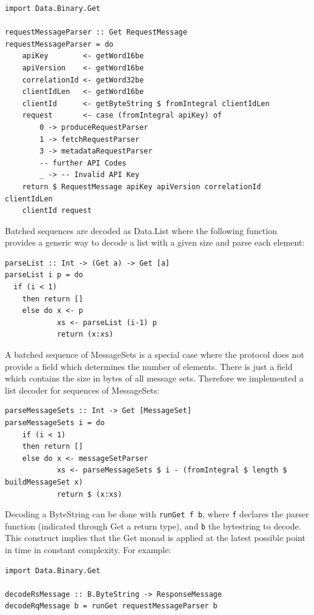 \begin{lstlisting}[caption={Decode of RequestMessage, based on ApiKey}]
import Data.Binary.Get

requestMessageParser :: Get RequestMessage 
requestMessageParser = do 
    apiKey        <- getWord16be
    apiVersion    <- getWord16be
    correlationId <- getWord32be
    clientIdLen   <- getWord16be
    clientId      <- getByteString $ fromIntegral clientIdLen
    request       <- case (fromIntegral apiKey) of
        0 -> produceRequestParser
        1 -> fetchRequestParser
        3 -> metadataRequestParser
        -- further API Codes 
        _ -> -- Invalid API Key 
    return $ RequestMessage apiKey apiVersion correlationId clientIdLen
    clientId request
\end{lstlisting}

Batched sequences are decoded as Data.List where the following function
provides a generic way to decode a list with a given size and parse each
element:
\begin{lstlisting}[caption={Decode list of any type}]
parseList :: Int -> (Get a) -> Get [a]
parseList i p = do 
  if (i < 1) 
    then return []
    else do x <- p
            xs <- parseList (i-1) p
            return (x:xs)
\end{lstlisting}

A batched sequence of MessageSets is a special case where the protocol does not
provide a field which determines the number of elements. There is just a field
which contains the size in bytes of all message sets. Therefore we implemented a
list decoder for sequences of MessageSets:

\begin{lstlisting}[caption={Decode list of MessageSet's}]
parseMessageSets :: Int -> Get [MessageSet]
parseMessageSets i = do
    if (i < 1)
    then return []
    else do x <- messageSetParser
            xs <- parseMessageSets $ i - (fromIntegral $ length $ buildMessageSet x)
            return $ (x:xs) 
\end{lstlisting}

Decoding a ByteString can be done with \lstinline{runGet f b}, where
\lstinline{f} declares the parser function (indicated through Get a return type),
and  \lstinline{b} the bytestring to decode. This construct implies that the Get
monad is applied at the latest possible point in time in constant complexity. For example: 
\begin{lstlisting}
import Data.Binary.Get

decodeRsMessage :: B.ByteString -> ResponseMessage
decodeRqMessage b = runGet requestMessageParser b

\end{lstlisting}


